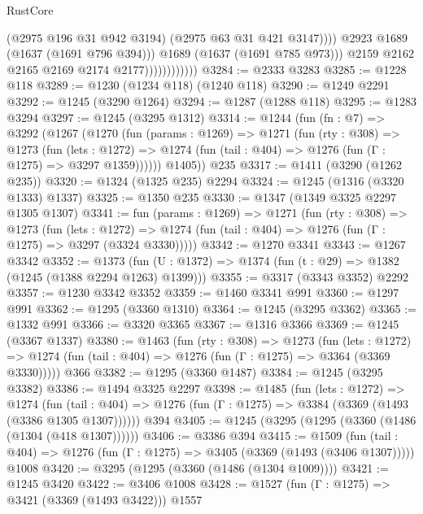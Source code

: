 \begin{lexlean}{RustCore}
\begin{coremodule}
                                      (@2975 @196 @31 @942 @3194)
                                      (@2975 @63 @31 @421 @3147))))
                                @2923
                                @1689
                                (@1637 (@1691 @796 @394)))
                              @1689
                              (@1637 (@1691 @785 @973)))
                            @2159
                            @2162
                            @2165
                            @2169
                            @2174
                            @2177))))))))))))
@3284 := @2333 @3283
@3285 := @1228 @118
@3289 := @1230 (@1234 @118) (@1240 @118)
@3290 := @1249 @2291
@3292 := @1245 (@3290 @1264)
@3294 := @1287 (@1288 @118)
@3295 := @1283 @3294
@3297 := @1245 (@3295 @1312)
@3314 := @1244
    (fun (fn : @7) =>
    @3292
      (@1267
        (@1270
          (fun (params : @1269) =>
          @1271
            (fun (rty : @308) =>
            @1273
              (fun (lets : @1272) =>
              @1274 (fun (tail : @404) => @1276 (fun (Γ : @1275) => @3297 @1359))))))
        @1405))
    @235
@3317 := @1411 (@3290 (@1262 @235))
@3320 := @1324 (@1325 @235) @2294
@3324 := @1245 (@1316 (@3320 @1333) @1337)
@3325 := @1350 @235
@3330 := @1347 (@1349 @3325 @2297 @1305 @1307)
@3341 := fun (params : @1269) =>
  @1271
    (fun (rty : @308) =>
    @1273
      (fun (lets : @1272) =>
      @1274 (fun (tail : @404) => @1276 (fun (Γ : @1275) => @3297 (@3324 @3330)))))
@3342 := @1270 @3341
@3343 := @1267 @3342
@3352 := @1373 (fun (U : @1372) => @1374 (fun (t : @29) => @1382 (@1245 (@1388 @2294 @1263) @1399)))
@3355 := @3317 (@3343 @3352) @2292
@3357 := @1230 @3342 @3352
@3359 := @1460 @3341 @991
@3360 := @1297 @991
@3362 := @1295 (@3360 @1310)
@3364 := @1245 (@3295 @3362)
@3365 := @1332 @991
@3366 := @3320 @3365
@3367 := @1316 @3366
@3369 := @1245 (@3367 @1337)
@3380 := @1463
    (fun (rty : @308) =>
    @1273
      (fun (lets : @1272) =>
      @1274 (fun (tail : @404) => @1276 (fun (Γ : @1275) => @3364 (@3369 @3330)))))
    @366
@3382 := @1295 (@3360 @1487)
@3384 := @1245 (@3295 @3382)
@3386 := @1494 @3325 @2297
@3398 := @1485
    (fun (lets : @1272) =>
    @1274
      (fun (tail : @404) => @1276 (fun (Γ : @1275) => @3384 (@3369 (@1493 (@3386 @1305 @1307))))))
    @394
@3405 := @1245 (@3295 (@1295 (@3360 (@1486 (@1304 (@418 @1307))))))
@3406 := @3386 @394
@3415 := @1509
    (fun (tail : @404) => @1276 (fun (Γ : @1275) => @3405 (@3369 (@1493 (@3406 @1307)))))
    @1008
@3420 := @3295 (@1295 (@3360 (@1486 (@1304 @1009))))
@3421 := @1245 @3420
@3422 := @3406 @1008
@3428 := @1527 (fun (Γ : @1275) => @3421 (@3369 (@1493 @3422))) @1557

\end{coremodule}
\end{lexlean}
